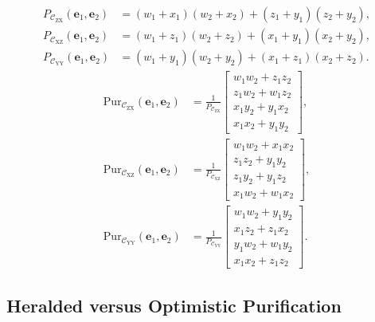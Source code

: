 \begin{align}
    P_{\mathcal C_\mathrm{ZX}}(\mathbf{e}_1,\mathbf{e}_2)
        &= (w_1+x_1)(w_2+x_2)+(z_1+y_1)(z_2+y_2), \label{eq:pzx}\\
    P_{\mathcal C_\mathrm{XZ}}(\mathbf{e}_1,\mathbf{e}_2)
        &= (w_1+z_1)(w_2+z_2)+(x_1+y_1)(x_2+y_2), \label{eq:pxz}\\
    P_{\mathcal C_\mathrm{YY}}(\mathbf{e}_1,\mathbf{e}_2)
        &= (w_1+y_1)(w_2+y_2)+(x_1+z_1)(x_2+z_2). \label{eq:pyy}
\end{align}
\begin{align}
    \mathrm{Pur}_{\mathcal C_\mathrm{ZX}}(\mathbf{e}_1,\mathbf{e}_2) &=
        \frac{1}{P_{\mathcal C_\mathrm{ZX}}}
        \begin{bmatrix}
            w_1 w_2 + z_1 z_2 \\
            z_1 w_2 + w_1 z_2 \\
            x_1 y_2 + y_1 x_2 \\
            x_1 x_2 + y_1 y_2
        \end{bmatrix},
        \label{eq:purzx}\\
    \mathrm{Pur}_{\mathcal C_\mathrm{XZ}}(\mathbf{e}_1,\mathbf{e}_2) &=
        \frac{1}{P_{\mathcal C_\mathrm{XZ}}}
        \begin{bmatrix}
            w_1 w_2 + x_1 x_2 \\
            z_1 z_2 + y_1 y_2 \\
            z_1 y_2 + y_1 z_2 \\
            x_1 w_2 + w_1 x_2
        \end{bmatrix},
        \label{eq:purxz}\\
    \mathrm{Pur}_{\mathcal C_\mathrm{YY}}(\mathbf{e}_1,\mathbf{e}_2) &=
        \frac{1}{P_{\mathcal C_\mathrm{YY}}}
        \begin{bmatrix}
            w_1 w_2 + y_1 y_2 \\
            x_1 z_2 + z_1 x_2 \\
            y_1 w_2 + w_1 y_2 \\
            x_1 x_2 + z_1 z_2
        \end{bmatrix}.
        \label{eq:puryy}
\end{align}

\subsection{Heralded versus Optimistic Purification}
\label{sec:bg:optimistic}

